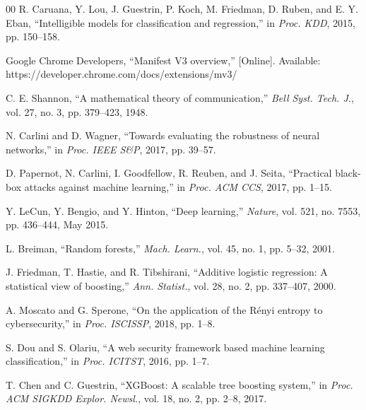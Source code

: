 \documentclass[conference]{IEEEtran}
\begin{document}
\begin{thebibliography}{00}
 R. Caruana, Y. Lou, J. Guestrin, P. Koch, M. Friedman, D. Ruben, and E. Y. Eban, ``Intelligible models for classification and regression,'' in \textit{Proc. KDD}, 2015, pp. 150--158.

 Google Chrome Developers, ``Manifest V3 overview,'' [Online]. Available: https://developer.chrome.com/docs/extensions/mv3/

 C. E. Shannon, ``A mathematical theory of communication,'' \textit{Bell Syst. Tech. J.}, vol. 27, no. 3, pp. 379--423, 1948.

 N. Carlini and D. Wagner, ``Towards evaluating the robustness of neural networks,'' in \textit{Proc. IEEE S\&P}, 2017, pp. 39--57.

 D. Papernot, N. Carlini, I. Goodfellow, R. Reuben, and J. Seita, ``Practical black-box attacks against machine learning,'' in \textit{Proc. ACM CCS}, 2017, pp. 1--15.

 Y. LeCun, Y. Bengio, and Y. Hinton, ``Deep learning,'' \textit{Nature}, vol. 521, no. 7553, pp. 436--444, May 2015.

 L. Breiman, ``Random forests,'' \textit{Mach. Learn.}, vol. 45, no. 1, pp. 5--32, 2001.

 J. Friedman, T. Hastie, and R. Tibshirani, ``Additive logistic regression: A statistical view of boosting,'' \textit{Ann. Statist.}, vol. 28, no. 2, pp. 337--407, 2000.

 A. Moscato and G. Sperone, ``On the application of the Rényi entropy to cybersecurity,'' in \textit{Proc. ISCISSP}, 2018, pp. 1--8.

 S. Dou and S. Olariu, ``A web security framework based machine learning classification,'' in \textit{Proc. ICITST}, 2016, pp. 1--7.

 T. Chen and C. Guestrin, ``XGBoost: A scalable tree boosting system,'' in \textit{Proc. ACM SIGKDD Explor. Newsl.}, vol. 18, no. 2, pp. 2--8, 2017.

\end{thebibliography}
\end{document}
